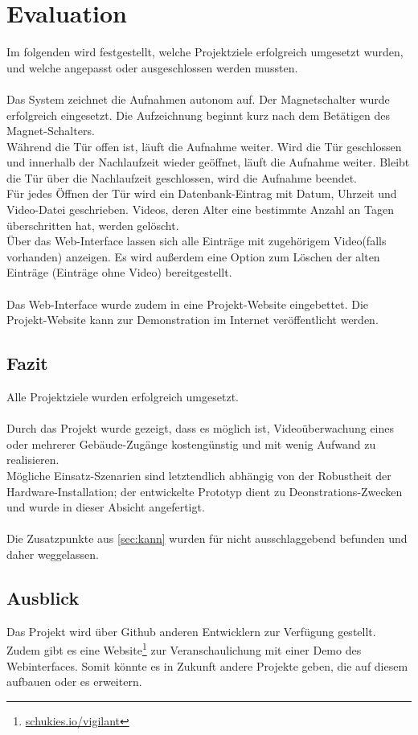 \chapter{Evaluation}

Im folgenden wird festgestellt, welche Projektziele erfolgreich umgesetzt wurden, und welche angepasst oder ausgeschlossen werden mussten.\\
\\
Das System zeichnet die Aufnahmen autonom auf. Der Magnetschalter wurde erfolgreich eingesetzt. Die Aufzeichnung beginnt kurz nach dem Betätigen des Magnet-Schalters.\\
Während die Tür offen ist, läuft die Aufnahme weiter. Wird die Tür geschlossen und innerhalb der Nachlaufzeit wieder geöffnet, läuft die Aufnahme weiter. Bleibt die Tür über die Nachlaufzeit geschlossen, wird die Aufnahme beendet.\\
Für jedes Öffnen der Tür wird ein Datenbank-Eintrag mit Datum, Uhrzeit und Video-Datei geschrieben. Videos, deren Alter eine bestimmte Anzahl an Tagen überschritten hat, werden gelöscht.\\
Über das Web-Interface lassen sich alle Einträge mit zugehörigem Video(falls vorhanden) anzeigen. Es wird außerdem eine Option zum Löschen der alten Einträge (Einträge ohne Video) bereitgestellt.\\
\\
Das Web-Interface wurde zudem in eine Projekt-Website eingebettet. Die Projekt-Website kann zur Demonstration im Internet veröffentlicht werden.

\vspace{1.0cm}

\section{Fazit}

Alle Projektziele wurden erfolgreich umgesetzt.\\
\\
Durch das Projekt wurde gezeigt, dass es möglich ist, Videoüberwachung eines oder mehrerer Gebäude-Zugänge kostengünstig und mit wenig Aufwand zu realisieren.\\
Mögliche Einsatz-Szenarien sind letztendlich abhängig von der Robustheit der Hardware-Installation; der entwickelte Prototyp dient zu Deonstrations-Zwecken und wurde in dieser Absicht angefertigt.\\
\\
Die Zusatzpunkte aus \ref{sec:kann} wurden für nicht ausschlaggebend befunden und daher weggelassen.

\vspace{1.0cm}

\section{Ausblick}

Das Projekt wird über Github anderen Entwicklern zur Verfügung gestellt. Zudem gibt es eine Website\footnote{\href{https://schukies.io}{schukies.io/vigilant}} zur Veranschaulichung mit einer Demo des Webinterfaces. Somit könnte es in Zukunft andere Projekte geben, die auf diesem aufbauen oder es erweitern.